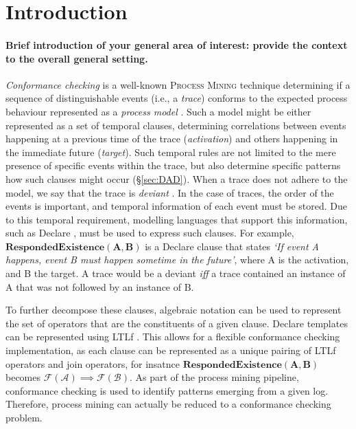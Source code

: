 \section{Introduction}

\paragraph*{Brief introduction of your general area of interest: provide the \textbf{context} to the overall general setting.}
\textit{Conformance checking} is a well-known \textsc{Process Mining} technique determining if a sequence of distinguishable events (i.e., a \textit{trace}) conforms to the expected process behaviour represented as a \textit{process model} \cite{RozinatA08}. Such a model might be either represented as a set of temporal clauses, determining correlations between events happening at a previous time of the trace (\textit{activation}) and others happening in the immediate future (\textit{target}). Such temporal rules are not limited to the mere presence of specific events within the trace, but also determine specific patterns how such clauses might occur (\S\ref{sec:DAD}). When a trace does not adhere to the model, we say that the trace is \textit{deviant} \cite{bpm21}. In the case of traces, the order of the events is important, and temporal information of each event must be stored. Due to this temporal requirement, modelling languages that support this information, such as Declare \cite{bpm21}, must be used to express such clauses. For example, $\mathbf{RespondedExistence(A,B)}$ is a Declare clause that states \emph{`If event A happens, event B must happen sometime in the future'}, where A is the activation, and B the target. A trace would be a deviant \emph{iff} a trace contained an instance of A that was not followed by an instance of B. 

To further decompose these clauses, algebraic notation can be used to represent the set of operators that are the constituents of a given clause. Declare templates can be represented using LTLf \cite{Li2020}. This allows for a flexible conformance checking implementation, as each clause can be represented as a unique pairing of LTLf operators and join operators, for insatnce $\mathbf{RespondedExistence(A,B)}$ becomes $\mathcal{F(A) \implies F(B)}$. As part of the process mining pipeline, conformance checking is used to identify patterns emerging from a given log. Therefore, process mining can actually be reduced to a conformance checking problem.
\medskip

